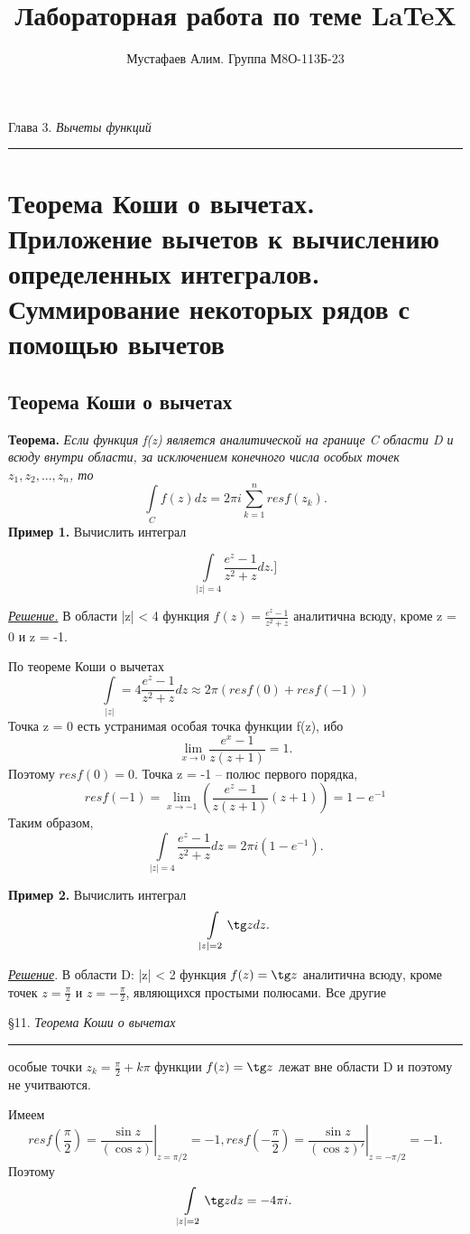 \documentclass[a4paper,12pt]{article}
\author{Мустафаев Алим. Группа М8О-113Б-23}
\title{Лабораторная работа по теме \LaTeX{}}
\begin{document}
\maketitle
\newpage
\begin{center}
Глава 3. \textit{Вычеты функций}
\end{center}
\noindent\rule{\textwidth}{1pt}
\section{Теорема Коши о вычетах. Приложение вычетов к вычислению определенных интегралов. Суммирование некоторых рядов с помощью вычетов}
\subsection{Теорема Коши о вычетах}
\textbf{Теорема.} \textit{Если функция f(z) является аналитической на границе C области D и всюду внутри области, за исключением конечного числа особых точек $z_1, z_2,..., z_n$, то}
\[ \int\limits_C f(z)dz = 2\pi i\sum_{k=1}^n res f(z_k).\]
\textbf{Пример 1.} Вычислить интеграл

\[\int\limits_{|z|=4} \frac{e^z - 1}{z^2 + z} dz.]\]

\textit{\underline{Решение.}} В области |z| < 4 функция $f(z) = \frac{e^z-1}{z^2+z}$ аналитична всюду, кроме z = 0 и z = -1.

По теореме Коши о вычетах
\[\int\limits_|z|=4 \frac{e^z-1}{z^2+z} dz \approx 2\pi (res f(0) + res f(-1)) \]
Точка z = 0 есть устранимая особая точка функции f(z), ибо
\[\lim_{x \to 0} \frac{e^x - 1}{z(z+1)} = 1.\]
Поэтому $res f(0) = 0$. Точка z = -1 -- полюс первого порядка,
\[ resf(-1) = \lim_{x \to -1} 
\left( \frac{e^z - 1}{z(z + 1)} (z+1) \right) = 1 - e^{-1}\]
Таким образом,
\[ \int\limits_{|z|=4} \frac{e^z-1}{z^2+z} dz = 2\pi i(1-e^{-1}).\]

\textbf{Пример 2.} Вычислить интеграл
\[ \int\limits_{|z|=2} \tg zdz.\]

\textit{\underline{Решение}}. В области D: |z| < 2 функция $f(z) = \tg z $ аналитична всюду, кроме точек $z = \frac{\pi}{2}$ и $z = -\frac{\pi}{2}$, являющихся простыми полюсами. Все другие
\newpage
\begin{center}
\S11. \textit{Теорема Коши о вычетах}
\end{center}
\noindent\rule{\textwidth}{1pt}
особые точки $z_k = \frac{\pi}{2} + k\pi $ функции $f(z) = \tg z$ лежат вне области D и поэтому не учитваются.

Имеем
\[ res f\left(\frac{\pi}{2} \right) = \left.\frac{\sin z}{(\cos z)} \right|_{z = \pi/2} = -1, res f\left(-\frac{\pi}{2} \right) = \left.\frac{\sin z}{(\cos z)'} \right|_{z = -\pi/2} = -1.\]
Поэтому
\[ \int\limits_{|z|=2} \tg z dz = -4\pi i.\]
\end{document}
